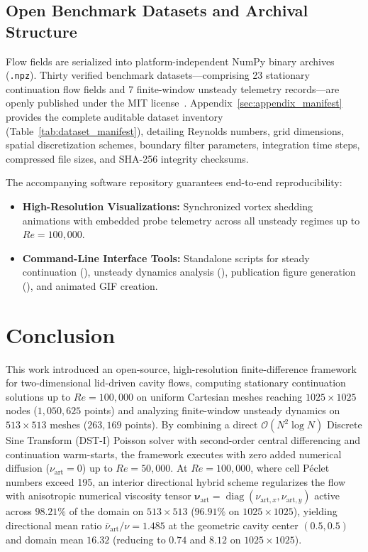 \documentclass[11pt,a4paper]{article}
\begin{document}
\subsection{Open Benchmark Datasets and Archival Structure}
Flow fields are serialized into platform-independent NumPy binary archives (\texttt{.npz}). Thirty verified benchmark datasets—comprising 23 stationary continuation flow fields and 7 finite-window unsteady telemetry records—are openly published under the MIT license~\cite{gangwar2026solver}. Appendix~\ref{sec:appendix_manifest} provides the complete auditable dataset inventory (Table~\ref{tab:dataset_manifest}), detailing Reynolds numbers, grid dimensions, spatial discretization schemes, boundary filter parameters, integration time steps, compressed file sizes, and SHA-256 integrity checksums.

The accompanying software repository guarantees end-to-end reproducibility:
\begin{itemize}
    \item \textbf{High-Resolution Visualizations:} Synchronized vortex shedding animations with embedded probe telemetry across all unsteady regimes up to $Re = 100{,}000$.
    \item \textbf{Command-Line Interface Tools:} Standalone scripts for steady continuation (), unsteady dynamics analysis (), publication figure generation (), and animated GIF creation.
\end{itemize}

\section{Conclusion}
This work introduced an open-source, high-resolution finite-difference framework for two-dimensional lid-driven cavity flows, computing stationary continuation solutions up to $Re = 100{,}000$ on uniform Cartesian meshes reaching $1025 \times 1025$ nodes ($1{,}050{,}625$ points) and analyzing finite-window unsteady dynamics on $513 \times 513$ meshes ($263{,}169$ points). By combining a direct $\mathcal{O}(N^2 \log N)$ Discrete Sine Transform (DST-I) Poisson solver with second-order central differencing and continuation warm-starts, the framework executes with zero added numerical diffusion ($\nu_{\text{art}} = 0$) up to $Re = 50{,}000$. At $Re = 100{,}000$, where cell P\'eclet numbers exceed 195, an interior directional hybrid scheme regularizes the flow with anisotropic numerical viscosity tensor $\boldsymbol{\nu}_{\mathrm{art}} = \operatorname{diag}(\nu_{\mathrm{art},x}, \nu_{\mathrm{art},y})$ active across $98.21\%$ of the domain on $513 \times 513$ ($96.91\%$ on $1025 \times 1025$), yielding directional mean ratio $\bar{\nu}_{\mathrm{art}}/\nu = 1.485$ at the geometric cavity center $(0.5, 0.5)$ and domain mean $16.32$ (reducing to $0.74$ and $8.12$ on $1025 \times 1025$).
\end{document}
